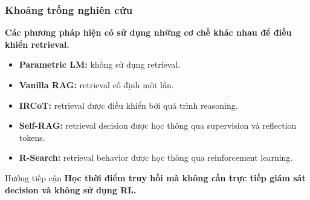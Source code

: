 \begin{frame}
    \frametitle{Khoảng trống nghiên cứu}

    \begin{center}
    \large
    \textbf{Các phương pháp hiện có sử dụng những cơ chế khác nhau
    để điều khiển retrieval.}
    \end{center}

    \vspace{0.4cm}

    \begin{itemize}

        \item \textbf{Parametric LM:}
        không sử dụng retrieval.

        \vspace{0.1cm}

        \item \textbf{Vanilla RAG:}
        retrieval cố định một lần.

        \vspace{0.1cm}

        \item \textbf{IRCoT:}
        retrieval được điều khiển bởi quá trình reasoning.

        \vspace{0.1cm}

        \item \textbf{Self-RAG:}
        retrieval decision được học thông qua supervision
        và reflection tokens.

        \vspace{0.1cm}

        \item \textbf{R-Search:}
        retrieval behavior được học thông qua reinforcement learning.

    \end{itemize}

    \vspace{0.25cm}

    \begin{block}{Hướng tiếp cận}
        \centering
        \textbf{Học thời điểm truy hồi mà không cần
        trực tiếp giám sát decision và không sử dụng RL.}
    \end{block}

\end{frame}




